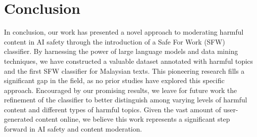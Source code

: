 \documentclass[preprint]{article}
\begin{document}
\section{Conclusion}

In conclusion, our work has presented a novel approach to moderating harmful content in AI safety through the introduction of a Safe For Work (SFW) classifier. By harnessing the power of large language models and data mining techniques, we have constructed a valuable dataset annotated with harmful topics and the first SFW classifier for Malaysian texts. This pioneering research fills a significant gap in the field, as no prior studies have explored this specific approach. Encouraged by our promising results, we leave for future work the refinement of the classifier to better distinguish among varying levels of harmful content and different types of harmful topics. Given the vast amount of user-generated content online, we believe this work represents a significant step forward in AI safety and content moderation.

{}

\end{document}
